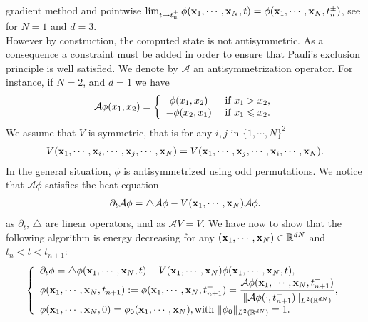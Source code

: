 \documentclass[11pt]{elsarticle}
\let \leq \leqslant
\newcommand{\R} {\ensuremath{\mathbb{R}}}
\begin{document}
gradient method
 and pointwise $\lim_{t\rightarrow t_{n}^{\pm}}\phi({\bf x}_1,\cdots,{\bf x}_N,t)=\phi({\bf x}_1,\cdots,{\bf x}_N,t_{n}^{\pm})$, see \cite{bao} for $N=1$ and $d=3$. \\
However by construction, the computed state is not antisymmetric. As a consequence a constraint must be added in order to ensure that Pauli's exclusion principle is well satisfied. We denote by $\mathcal{A}$ an antisymmetrization operator. For instance, if $N=2$, and $d=1$ we have
\begin{eqnarray*}
\mathcal{A}\phi(x_1,x_2)=
\left\{
\begin{array}{cl}
\phi(x_1,x_2) & \hbox { if }  x_1 > x_2, \\
-\phi(x_2,x_1) & \hbox { if }  x_1 \leq x_2.
\end{array}
\right.
\end{eqnarray*}
We assume that $V$ is symmetric, that is for any $i,j$ in $\{1,\cdots,N\}^2$
\begin{eqnarray*}\label{sym}
V({\bf x}_1,\cdots,{\bf x}_i,\cdots,{\bf x}_j,\cdots,{\bf x}_N) = V({\bf x}_1,\cdots,{\bf x}_j,\cdots,{\bf x}_i,\cdots,{\bf x}_N).
\end{eqnarray*}
In the general situation, $\phi$ is antisymmetrized using odd permutations. We notice that $\mathcal{A}\phi$ satisfies the heat equation
\begin{eqnarray}\label{HA}
\partial_t \mathcal{A}\phi =\triangle \mathcal{A}\phi - V({\bf x}_1,\cdots,{\bf x}_N)\mathcal{A}\phi.
\end{eqnarray}
as $\partial_t$, $\triangle$ are linear operators, and as $\mathcal{A}V=V$. We have now to show that the following algorithm is energy decreasing for any $({\bf x}_1,\cdots,{\bf x}_N) \in  \R^{dN}$ and $t_{n}< t <t_{n+1}$:
\begin{eqnarray}\label{e1ter}
\left\{
\begin{array}{l}
\partial_t \phi  =\triangle \phi({\bf x}_1,\cdots,{\bf x}_N,t) - V({\bf x}_1,\cdots,{\bf x}_N)\phi({\bf x}_1,\cdots,{\bf x}_N,t), \\
\displaystyle \phi({\bf x}_1,\cdots,{\bf x}_N,t_{n+1}):=\phi({\bf x}_1,\cdots,{\bf x}_N,t^{+}_{n+1})=\frac{\mathcal{A}\phi({\bf x}_1,\cdots,{\bf x}_N,t^{-}_{n+1})}{\|\mathcal{A}\phi(\cdot ,t^{-}_{n+1})\|_{L^{2}(\mathbb{R}^{dN})}},\\
\phi({\bf x}_1,\cdots,{\bf x}_N,0)=\phi_0({\bf x}_1,\cdots,{\bf x}_N), \textrm{with $\|\phi_{0} \|_{L^{2}(\mathbb{R}^{dN})}=1$.}
\end{array}
\right.
\end{eqnarray} 
\end{document}
